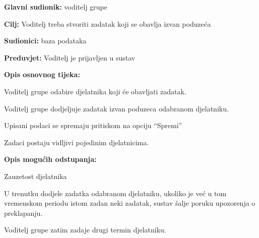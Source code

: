 			\noindent {}
			\begin{packed_item}
				\item \textbf{Glavni sudionik: } voditelj grupe
				\item  \textbf{Cilj:} Voditelj treba stvoriti zadatak koji se obavlja izvan poduzeća 
				\item  \textbf{Sudionici:} baza podataka
				\item  \textbf{Preduvjet:} Voditelj je prijavljen u sustav
				\item  \textbf{Opis osnovnog tijeka:}
				\item[] \begin{packed_enum}
					\item Voditelj grupe odabire djelatnika koji će obavljati zadatak. 
					\item Voditelj grupe dodjeljuje zadatak izvan poduzeca odabranom djelatniku.
					\item Upisani podaci se spremaju pritiskom na opciju “Spremi” 
					\item Zadaci postaju vidljivi pojedinim djelatnicima. 
				\end{packed_enum}
				\item  \textbf{Opis mogućih odstupanja:}
				\item[] \begin{packed_item}
					\item[2.a] Zauzetost djelatnika
					\item[] \begin{packed_enum}
						\item U trenutku dodjele zadatka odabranom djelatniku, ukoliko je već u tom vremenskom periodu istom zadan neki zadatak, sustav šalje poruku upozorenja o preklapanju. 
						\item Voditelj grupe zatim zadaje drugi termin djelatniku. 
					\end{packed_enum}
				\end{packed_item}
			\end{packed_item}
			\noindent {}
